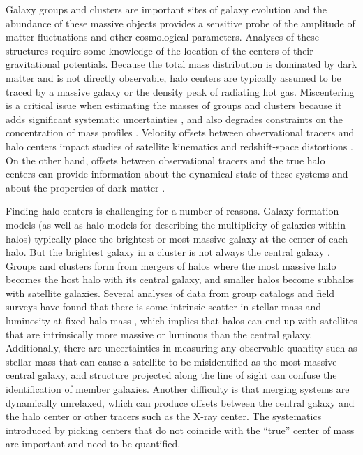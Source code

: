 Galaxy groups and clusters are important sites of galaxy evolution and
the abundance of these massive objects provides a sensitive probe of
the amplitude of matter fluctuations and other cosmological
parameters. Analyses of these structures require some knowledge of the
location of the centers of their gravitational potentials. Because the
total mass distribution is dominated by dark matter and is not
directly observable, halo centers are typically assumed to be traced
by a massive galaxy or the density peak of radiating hot
gas. Miscentering is a critical issue when estimating the masses 
of groups and clusters because it adds significant systematic
uncertainties \citep[e.g.,][]{Johnston2007a, Johnston2007b,
  Mandelbaum2010, Rozo2011}, and also degrades constraints on the
concentration of mass profiles \citep{Mandelbaum2008}. Velocity
offsets between observational tracers and halo centers impact studies
of satellite kinematics \citep{Skibba2011, Wojtak2011} and
redshift-space distortions \citep{Hikage2012}. On the other hand, offsets between
observational tracers and the true halo centers can provide information about
the dynamical state of these systems and about the properties of dark
matter \citep{Clowe2006, Massey2011}.

Finding halo centers is challenging for a number of reasons. Galaxy
formation models (as well as halo models for describing the
multiplicity of galaxies within halos) typically place the brightest
or most massive galaxy at the center of each halo. But the brightest
galaxy in a cluster is not always the central galaxy \citep[][and
references therein]{Skibba2011}. Groups and clusters form from mergers
of halos where the most massive halo becomes the host halo with its
central galaxy, and smaller halos become subhalos with satellite
galaxies. Several analyses of data from group
    catalogs and field surveys have found that there is some intrinsic scatter
    in stellar mass and luminosity at fixed halo mass \citep{Yang2009,
      More2009, Leauthaud2012, Reddick2012}, which implies that
    halos can end up with satellites that are intrinsically more
    massive or luminous than the central galaxy. Additionally, there are
uncertainties in measuring any observable quantity such as stellar
mass that can cause a satellite to be misidentified as the most
massive central galaxy, and structure projected along the line of
sight can confuse the identification of member galaxies. Another difficulty
is that merging systems are dynamically unrelaxed, which can produce offsets
between the central galaxy and the halo center or other tracers such
as the X-ray center.  The systematics introduced by picking centers
that do not coincide with the ``true'' center of mass are important
and need to be quantified.

